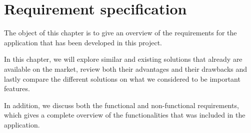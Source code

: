 \chapter{Requirement specification}
\label {sec:recSpecification}

The object of this chapter is to give an overview of the requirements for the application that has been developed in this project.

In this chapter, we will explore similar and existing solutions that already are available on the market, review both their advantages and their drawbacks and lastly compare the different solutions on what we considered to be important features. 

In addition, we discuss both the functional and non-functional requirements, which gives a complete overview of the functionalities that was included in the application.

\newpage



